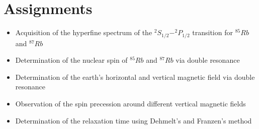 \section{Assignments}

\begin{itemize}
\item Acquisition of the hyperfine spectrum of the $^2S_{1/2}-^2P_{1/2}$ transition for $^{85}Rb$ and $^{87}Rb$
\item Determination of the nuclear spin of  $^{85}Rb$ and $^{87}Rb$ via double resonance
\item Determination of the earth's horizontal and vertical magnetic field via double resonance
\item Observation of the spin precession around different vertical magnetic fields
\item Determination of the relaxation time using Dehmelt's and Franzen's method
\end{itemize}